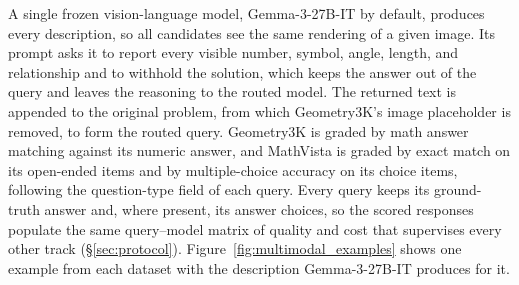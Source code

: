 A single frozen vision-language model, Gemma-3-27B-IT by default, produces every description, so all candidates see the same rendering of a given image. Its prompt asks it to report every visible number, symbol, angle, length, and relationship and to withhold the solution, which keeps the answer out of the query and leaves the reasoning to the routed model. The returned text is appended to the original problem, from which Geometry3K's image placeholder is removed, to form the routed query. Geometry3K is graded by math answer matching against its numeric answer, and MathVista is graded by exact match on its open-ended items and by multiple-choice accuracy on its choice items, following the question-type field of each query. Every query keeps its ground-truth answer and, where present, its answer choices, so the scored responses populate the same query--model matrix of quality and cost that supervises every other track (\S\ref{sec:protocol}). Figure~\ref{fig:multimodal_examples} shows one example from each dataset with the description Gemma-3-27B-IT produces for it.

